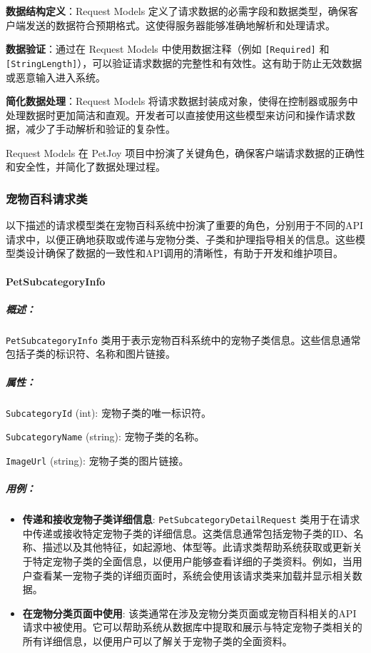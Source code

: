 \textbf{数据结构定义}：Request Models 定义了请求数据的必需字段和数据类型，确保客户端发送的数据符合预期格式。这使得服务器能够准确地解析和处理请求。

\textbf{数据验证}：通过在 Request Models 中使用数据注释（例如 \texttt{[Required]} 和 \texttt{[StringLength]}），可以验证请求数据的完整性和有效性。这有助于防止无效数据或恶意输入进入系统。

\textbf{简化数据处理}：Request Models 将请求数据封装成对象，使得在控制器或服务中处理数据时更加简洁和直观。开发者可以直接使用这些模型来访问和操作请求数据，减少了手动解析和验证的复杂性。

Request Models 在 PetJoy 项目中扮演了关键角色，确保客户端请求数据的正确性和安全性，并简化了数据处理过程。

\subsubsection{宠物百科请求类}

以下描述的请求模型类在宠物百科系统中扮演了重要的角色，分别用于不同的API请求中，以便正确地获取或传递与宠物分类、子类和护理指导相关的信息。这些模型类设计确保了数据的一致性和API调用的清晰性，有助于开发和维护项目。

\paragraph{PetSubcategoryInfo}
\subparagraph{概述：} \texttt{PetSubcategoryInfo} 类用于表示宠物百科系统中的宠物子类信息。这些信息通常包括子类的标识符、名称和图片链接。

\subparagraph{属性：}

\texttt{SubcategoryId} (int): 宠物子类的唯一标识符。

\texttt{SubcategoryName} (string): 宠物子类的名称。

\texttt{ImageUrl} (string): 宠物子类的图片链接。


\subparagraph{用例：}
\begin{itemize}
	\item \textbf{传递和接收宠物子类详细信息}: \texttt{PetSubcategoryDetailRequest} 类用于在请求中传递或接收特定宠物子类的详细信息。这类信息通常包括宠物子类的ID、名称、描述以及其他特征，如起源地、体型等。此请求类帮助系统获取或更新关于特定宠物子类的全面信息，以便用户能够查看详细的子类资料。例如，当用户查看某一宠物子类的详细页面时，系统会使用该请求类来加载并显示相关数据。
	\item \textbf{在宠物分类页面中使用}: 该类通常在涉及宠物分类页面或宠物百科相关的API请求中被使用。它可以帮助系统从数据库中提取和展示与特定宠物子类相关的所有详细信息，以便用户可以了解关于宠物子类的全面资料。
\end{itemize}

